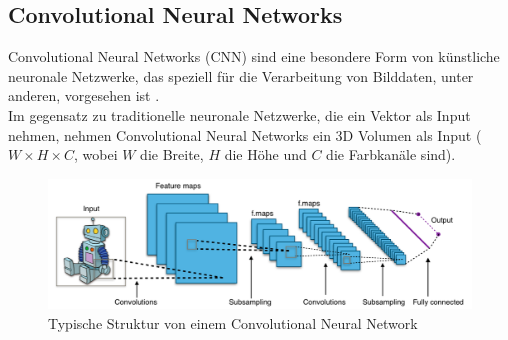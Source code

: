 
\subsection{Convolutional Neural Networks}
Convolutional Neural Networks (\gls{CNN}) sind eine besondere Form von künstliche neuronale Netzwerke, das speziell für 
die Verarbeitung von Bilddaten, unter anderen, vorgesehen ist \cite{convnet-erklaerung}.
\\
Im gegensatz zu traditionelle neuronale Netzwerke, die ein Vektor als Input nehmen, nehmen Convolutional Neural Networks ein 3D Volumen als Input
($ W \times H \times C $, wobei $W$ die Breite, $H$ die Höhe und $C$ die Farbkanäle sind).

\begin{figure}[H]
  \centering
  \includegraphics[width=1\textwidth]{resources/cnn/typical_cnn.png}
  \caption{
    Typische Struktur von einem Convolutional Neural Network
    \cite{typical_cnn_img}
  }
  \label{image:typical_cnn_img}
\end{figure}


